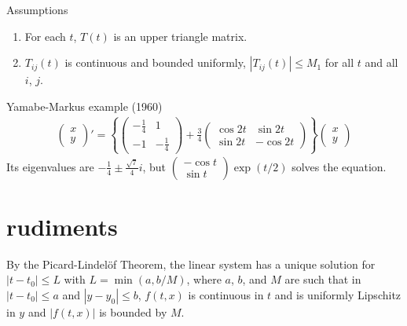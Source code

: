 \documentclass[a4paper,11pt]{article}
\newcounter{Theorem}
\theoremstyle{remark}
\begin{document}
Assumptions
\begin{enumerate}
 \item For each $t$, $T(t)$ is an upper triangle matrix.
 \item $T_{ij}(t)$ is continuous and bounded uniformly, $|T_{ij}(t)| \le M_1$ for all $t$ and all $i$, $j$.
\end{enumerate}

Yamabe-Markus example (1960)
\begin{align*}
 \begin{pmatrix}  x\\y \end{pmatrix}' = \left\{\begin{pmatrix}  -\frac{1}{4} & 1\\-1 & -\frac{1}{4} \end{pmatrix}+ \frac{3}{4}\begin{pmatrix} \cos 2t & \sin 2t\\ \sin 2t & -\cos 2t \end{pmatrix}\right\} \begin{pmatrix}  x\\y \end{pmatrix}
\end{align*}
Its eigenvalues are $-\frac{1}{4} \pm \frac{\sqrt{7}}{4}i$, but $\begin{pmatrix}  -\cos t\\ \sin t \end{pmatrix}\exp(t/2)$ solves the equation.

\section{rudiments}
By the Picard-Lindel\"{o}f Theorem, the linear system has a unique solution for $|t-t_0| \le L$ with $L=\min(a,b/M)$, where $a$, $b$, and $M$ are such that in $|t-t_0|\le a$ and $|y-y_0| \le b$, $f(t,x)$ is continuous in $t$ and is uniformly Lipschitz in $y$ and $|f(t,x)|$ is bounded by $M$. 
\end{document}

